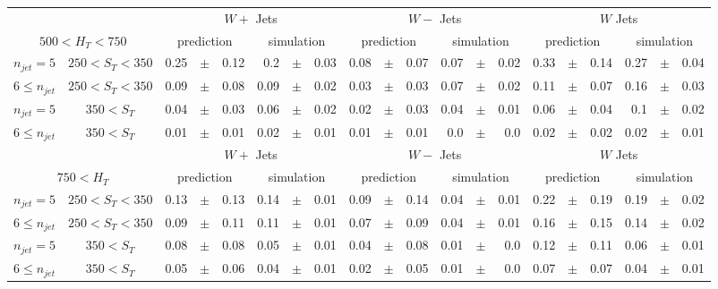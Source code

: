 \documentclass[12pt]{paper}
\begin{document}
\begin{sidewaystable}[ht]
\begin{center}
\begin{tabular}{cc|rrr|rrr|rrr|rrr|rrr|rrr}
& & \multicolumn{6}{c|}{$W+$ Jets}&\multicolumn{6}{c|}{$W-$ Jets}&\multicolumn{6}{c}{$W$ Jets}\\
\multicolumn{2}{c|}{$500< H_{T}< 750$} & \multicolumn{3}{c}{prediction}&\multicolumn{3}{c|}{simulation}&\multicolumn{3}{c}{prediction}&\multicolumn{3}{c|}{simulation}&\multicolumn{3}{c}{prediction}&\multicolumn{3}{c}{simulation}\\\hline
$n_{jet}=5$ & $250< S_{T}< 350$ & 0.25&$\pm$&0.12 & 0.2&$\pm$&0.03 & 0.08&$\pm$&0.07 & 0.07&$\pm$&0.02 & 0.33&$\pm$&0.14 & 0.27&$\pm$&0.04\\
$6\leq n_{jet}$ & $250< S_{T}< 350$ & 0.09&$\pm$&0.08 & 0.09&$\pm$&0.02 & 0.03&$\pm$&0.03 & 0.07&$\pm$&0.02 & 0.11&$\pm$&0.07 & 0.16&$\pm$&0.03\\
$n_{jet}=5$ & $350< S_{T}$ & 0.04&$\pm$&0.03 & 0.06&$\pm$&0.02 & 0.02&$\pm$&0.03 & 0.04&$\pm$&0.01 & 0.06&$\pm$&0.04 & 0.1&$\pm$&0.02\\
$6\leq n_{jet}$ & $350< S_{T}$ & 0.01&$\pm$&0.01 & 0.02&$\pm$&0.01 & 0.01&$\pm$&0.01 & 0.0&$\pm$&0.0 & 0.02&$\pm$&0.02 & 0.02&$\pm$&0.01\\
\hline
& & \multicolumn{6}{c|}{$W+$ Jets}&\multicolumn{6}{c|}{$W-$ Jets}&\multicolumn{6}{c}{$W$ Jets}\\
\multicolumn{2}{c|}{$750< H_{T}$} & \multicolumn{3}{c}{prediction}&\multicolumn{3}{c|}{simulation}&\multicolumn{3}{c}{prediction}&\multicolumn{3}{c|}{simulation}&\multicolumn{3}{c}{prediction}&\multicolumn{3}{c}{simulation}\\\hline
$n_{jet}=5$ & $250< S_{T}< 350$ & 0.13&$\pm$&0.13 & 0.14&$\pm$&0.01 & 0.09&$\pm$&0.14 & 0.04&$\pm$&0.01 & 0.22&$\pm$&0.19 & 0.19&$\pm$&0.02\\
$6\leq n_{jet}$ & $250< S_{T}< 350$ & 0.09&$\pm$&0.11 & 0.11&$\pm$&0.01 & 0.07&$\pm$&0.09 & 0.04&$\pm$&0.01 & 0.16&$\pm$&0.15 & 0.14&$\pm$&0.02\\
$n_{jet}=5$ & $350< S_{T}$ & 0.08&$\pm$&0.08 & 0.05&$\pm$&0.01 & 0.04&$\pm$&0.08 & 0.01&$\pm$&0.0 & 0.12&$\pm$&0.11 & 0.06&$\pm$&0.01\\
$6\leq n_{jet}$ & $350< S_{T}$ & 0.05&$\pm$&0.06 & 0.04&$\pm$&0.01 & 0.02&$\pm$&0.05 & 0.01&$\pm$&0.0 & 0.07&$\pm$&0.07 & 0.04&$\pm$&0.01\\
\end{tabular}
\end{center}
\end{sidewaystable}
\end{document}
